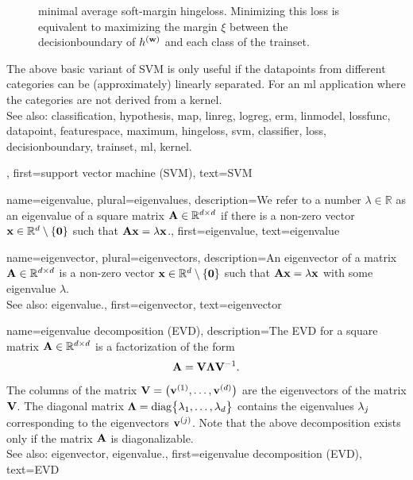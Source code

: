 {{\begin{figure}[H]
\begin{center}
{					minimal average soft-margin \gls{hingeloss}. Minimizing this \gls{loss} is equivalent 
					to maximizing the margin $\xi$ between the \gls{decisionboundary} of $h^{({\bf w})}$ 
					and each class of the \gls{trainset}.}
				\label{fig_svm_gls_dict}
			\end{center}
		\end{figure}
		The above basic variant of SVM is only useful if the \glspl{datapoint} from different categories can be  
		(approximately) linearly separated. For an \gls{ml} application where the categories are not 
		derived from a \gls{kernel}.
				\\
		See also: \gls{classification}, \gls{hypothesis}, \gls{map}, \gls{linreg}, \gls{logreg}, \gls{erm}, \gls{linmodel}, \gls{lossfunc}, \gls{datapoint}, \gls{featurespace}, \gls{maximum}, \gls{hingeloss}, \gls{svm}, \gls{classifier}, \gls{loss}, \gls{decisionboundary}, \gls{trainset}, \gls{ml}, \gls{kernel}.},
	first={support vector machine (SVM)},
	text={SVM} 
}

{name={eigenvalue}, plural={eigenvalues}, 
	description={We refer to a 
		number $\lambda \in \mathbb{R}$ as an eigenvalue of a square matrix $\mathbf{A} \in \mathbb{R}^{d \times d}$ 
		if there is a non-zero vector ${\bf x} \in \mathbb{R}^{d} \setminus \{ \mathbf{0} \}$ such that $\mathbf{A} {\bf x} = \lambda {\bf x}$.},
	first={eigenvalue},
	text={eigenvalue} 
}
	
{name={eigenvector}, plural={eigenvectors}, 
	description={An 
		eigenvector of a matrix $\mathbf{A} \in \mathbb{R}^{d \times d}$ 
		is a non-zero vector ${\bf x} \in \mathbb{R}^{d} \setminus \{ \mathbf{0} \}$ 
		such that $\mathbf{A} {\bf x} = \lambda {\bf x}$ with some \gls{eigenvalue} $\lambda$.
				\\
		See also: \gls{eigenvalue}.},
	first={eigenvector},
	text={eigenvector} 
}

{name={eigenvalue decomposition (EVD)}, 
	description={The EVD
		for a square matrix ${\bf A} \in \mathbb{R}^{d \times d}$ 
		is a factorization of the form 
		$${\bf A} = \mathbf{V} {\bm \Lambda} \mathbf{V}^{-1}.$$ 
		The columns of the matrix $\mathbf{V} = \big( {\bf v}^{(1)}, \ldots, {\bf v}^{(d)} \big)$ are the 
		\glspl{eigenvector} of the matrix $\mathbf{V}$. The diagonal matrix 
		${\bm \Lambda} = {\rm diag} \big\{ \lambda_{1}, \ldots, \lambda_{d} \big\}$ 
		contains the \glspl{eigenvalue} $\lambda_{j}$ corresponding to the \glspl{eigenvector} ${\bf v}^{(j)}$. 
		Note that the above decomposition exists only if the matrix ${\bf A}$ is diagonalizable.
				\\
		See also: \gls{eigenvector}, \gls{eigenvalue}.},
	first={eigenvalue decomposition (EVD)},
	text={EVD} 
}

